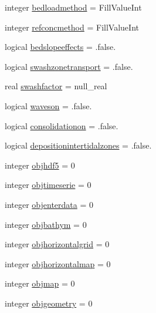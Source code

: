 \begin{DoxyCompactItemize}
\item 
integer \mbox{\hyperlink{structmodulesediment_1_1t__sediment_a8d2a157a887c40474db2a2fb2cc217be}{bedloadmethod}} = Fill\+Value\+Int
\item 
integer \mbox{\hyperlink{structmodulesediment_1_1t__sediment_ab7e7952008ec55e85ad9f0585d97c7d5}{refconcmethod}} = Fill\+Value\+Int
\item 
logical \mbox{\hyperlink{structmodulesediment_1_1t__sediment_aed8e2aa5ab41bfeec26914415abceb70}{bedslopeeffects}} = .false.
\item 
logical \mbox{\hyperlink{structmodulesediment_1_1t__sediment_a5989fbe40e8d3210cb7e067af719704b}{swashzonetransport}} = .false.
\item 
real \mbox{\hyperlink{structmodulesediment_1_1t__sediment_ae884646130d5aceb3875862015025bad}{swashfactor}} = null\+\_\+real
\item 
logical \mbox{\hyperlink{structmodulesediment_1_1t__sediment_aa422aed925418bbe2bb4ff0db0d38522}{waveson}} = .false.
\item 
logical \mbox{\hyperlink{structmodulesediment_1_1t__sediment_a6a1d55c282e289398aa502734ec8269d}{consolidationon}} = .false.
\item 
logical \mbox{\hyperlink{structmodulesediment_1_1t__sediment_a352b18ae1ee3982bc8e47fbc196c948d}{depositionintertidalzones}} = .false.
\item 
integer \mbox{\hyperlink{structmodulesediment_1_1t__sediment_a6fa26cfc4499ea72131901acee56120f}{objhdf5}} = 0
\item 
integer \mbox{\hyperlink{structmodulesediment_1_1t__sediment_a76d92627df54389bf064dea32cf7c807}{objtimeserie}} = 0
\item 
integer \mbox{\hyperlink{structmodulesediment_1_1t__sediment_a53350a08b821af760af45ddfad23b328}{objenterdata}} = 0
\item 
integer \mbox{\hyperlink{structmodulesediment_1_1t__sediment_a6c88f9a4a9f72f9e47b14f8b6975c42c}{objbathym}} = 0
\item 
integer \mbox{\hyperlink{structmodulesediment_1_1t__sediment_a7a59bf5459c3e5468016bd2b7141d54e}{objhorizontalgrid}} = 0
\item 
integer \mbox{\hyperlink{structmodulesediment_1_1t__sediment_a2efe2f71bd91e61c4f94772bbf7b60eb}{objhorizontalmap}} = 0
\item 
integer \mbox{\hyperlink{structmodulesediment_1_1t__sediment_a120c4eed0b9852d8ee84ce1ac9466e24}{objmap}} = 0
\item 
integer \mbox{\hyperlink{structmodulesediment_1_1t__sediment_aaf7c5adc8d3014210c6eb1bd60c4adf7}{objgeometry}} = 0

\end{DoxyCompactItemize}
